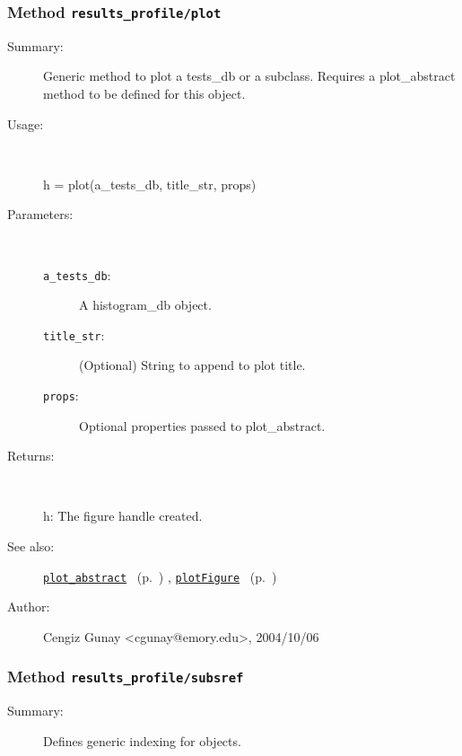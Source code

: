 \subsubsection[Method \texttt{plot}]{Method \texttt{results\_profile/plot}}%
%
\label{ref_results_profile__plot}%
\hypertarget{ref_results_profile__plot}{}%
\begin{description}
\item[Summary:]Generic method to plot a tests\_db or a subclass. Requires a 
	plot\_abstract method to be defined for this object.
%
\item[Usage:]~%
\begin{lyxcode}%
h = plot(a\_tests\_db, title\_str, props)
%
\end{lyxcode}%
%
%
\item[Parameters:]~
\begin{description}%
\item[\texttt{a\_tests\_db}:]
 A histogram\_db object.
\item[\texttt{title\_str}:]
 (Optional) String to append to plot title.
\item[\texttt{props}:]
 Optional properties passed to plot\_abstract.
\end{description}%
%
\item[Returns:
]~

	h: The figure handle created.
%
%
\item[See also:]%
\hyperlink{ref_plot_abstract}{\texttt{plot\_abstract}}%
\ (p.~\pageref{ref_plot_abstract})%
%
, \hyperlink{ref_plotFigure}{\texttt{plotFigure}}%
\ (p.~\pageref{ref_plotFigure})%
%
%
\item[Author:]%
Cengiz Gunay <cgunay@emory.edu>, 2004/10/06
%
\end{description}
\methodline%
\subsubsection[Method \texttt{subsref}]{Method \texttt{results\_profile/subsref}}%
%
\label{ref_results_profile__subsref}%
\hypertarget{ref_results_profile__subsref}{}%
\begin{description}
\item[Summary:]Defines generic indexing for objects.
%
%
%
%
%
%
%
%
\end{description}
\methodline%
